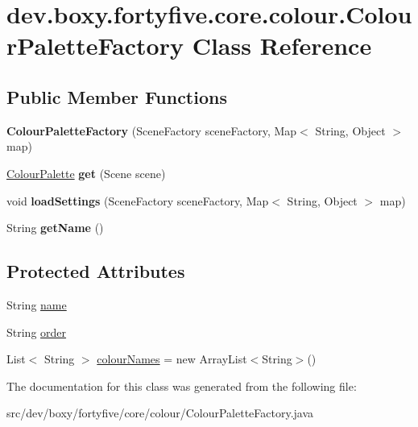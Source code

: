 \hypertarget{classdev_1_1boxy_1_1fortyfive_1_1core_1_1colour_1_1_colour_palette_factory}{
\section{dev.boxy.fortyfive.core.colour.ColourPaletteFactory Class Reference}
\label{d1/d68/classdev_1_1boxy_1_1fortyfive_1_1core_1_1colour_1_1_colour_palette_factory}
}
\subsection*{Public Member Functions}
\begin{DoxyCompactItemize}
\item 
\hypertarget{classdev_1_1boxy_1_1fortyfive_1_1core_1_1colour_1_1_colour_palette_factory_ab640fceffd680b33d72d6054f8eb676b}{
{\bfseries ColourPaletteFactory} (SceneFactory sceneFactory, Map$<$ String, Object $>$ map)}
\label{d1/d68/classdev_1_1boxy_1_1fortyfive_1_1core_1_1colour_1_1_colour_palette_factory_ab640fceffd680b33d72d6054f8eb676b}

\item 
\hypertarget{classdev_1_1boxy_1_1fortyfive_1_1core_1_1colour_1_1_colour_palette_factory_aa903094911a3c50fef39b5bfc71aabb9}{
\hyperlink{interfacedev_1_1boxy_1_1fortyfive_1_1core_1_1colour_1_1_colour_palette}{ColourPalette} {\bfseries get} (Scene scene)}
\label{d1/d68/classdev_1_1boxy_1_1fortyfive_1_1core_1_1colour_1_1_colour_palette_factory_aa903094911a3c50fef39b5bfc71aabb9}

\item 
\hypertarget{classdev_1_1boxy_1_1fortyfive_1_1core_1_1colour_1_1_colour_palette_factory_afbe595d5ea232c7fcf4ad8b323f3c867}{
void {\bfseries loadSettings} (SceneFactory sceneFactory, Map$<$ String, Object $>$ map)}
\label{d1/d68/classdev_1_1boxy_1_1fortyfive_1_1core_1_1colour_1_1_colour_palette_factory_afbe595d5ea232c7fcf4ad8b323f3c867}

\item 
\hypertarget{classdev_1_1boxy_1_1fortyfive_1_1core_1_1colour_1_1_colour_palette_factory_a3cdacc1267422144247e65f6f5b2ba87}{
String {\bfseries getName} ()}
\label{d1/d68/classdev_1_1boxy_1_1fortyfive_1_1core_1_1colour_1_1_colour_palette_factory_a3cdacc1267422144247e65f6f5b2ba87}

\end{DoxyCompactItemize}
\subsection*{Protected Attributes}
\begin{DoxyCompactItemize}
\item 
String \hyperlink{group__colour_palettes_gaefe7048b51865679210bed6bac8ec293}{name}
\item 
String \hyperlink{group__colour_palettes_gaf45caec18a77e26b4836d04f51f7c267}{order}
\item 
List$<$ String $>$ \hyperlink{group__colour_palettes_gaf1d7c0a9d0cb9700e6eaaad2664109a7}{colourNames} = new ArrayList$<$String$>$()
\end{DoxyCompactItemize}


The documentation for this class was generated from the following file:\begin{DoxyCompactItemize}
\item 
src/dev/boxy/fortyfive/core/colour/ColourPaletteFactory.java\end{DoxyCompactItemize}
